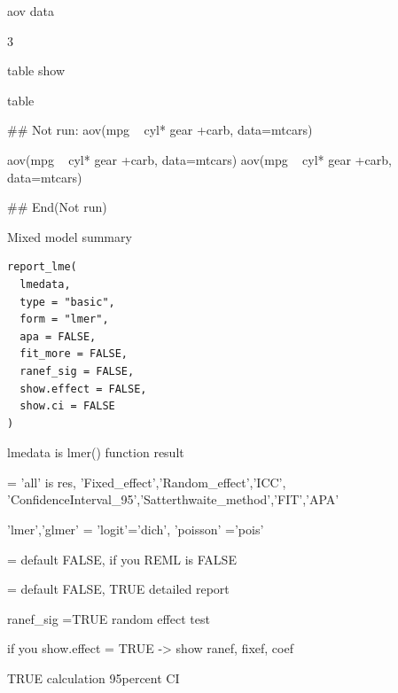 \documentclass[a4paper]{book}
\begin{document}
%
\begin{Arguments}
\begin{ldescription}
\item[\code{data}] aov data

\item[\code{digits}] 3

\item[\code{print}] table show
\end{ldescription}
\end{Arguments}
%
\begin{Value}
table
\end{Value}
%
\begin{Examples}
\begin{ExampleCode}

## Not run: 
aov(mpg ~ cyl* gear +carb, data=mtcars) %

aov(mpg ~ cyl* gear +carb, data=mtcars) %
aov(mpg ~ cyl* gear +carb, data=mtcars) %


## End(Not run)

\end{ExampleCode}
\end{Examples}
%
\begin{Description}
Mixed model summary
\end{Description}
%
\begin{Usage}
\begin{verbatim}
report_lme(
  lmedata,
  type = "basic",
  form = "lmer",
  apa = FALSE,
  fit_more = FALSE,
  ranef_sig = FALSE,
  show.effect = FALSE,
  show.ci = FALSE
)
\end{verbatim}
\end{Usage}
%
\begin{Arguments}
\begin{ldescription}
\item[\code{lmedata}] lmedata is lmer() function result

\item[\code{type}] = 'all' is res, 'Fixed\_effect','Random\_effect','ICC', 'ConfidenceInterval\_95','Satterthwaite\_method','FIT','APA'

\item[\code{form}] 'lmer','glmer' = 'logit'='dich', 'poisson' ='pois'

\item[\code{apa}] = default FALSE, if you  REML is FALSE

\item[\code{fit\_more}] = default FALSE, TRUE detailed report

\item[\code{ranef\_sig}] ranef\_sig =TRUE  random effect test

\item[\code{show.effect}] if you show.effect = TRUE -> show ranef, fixef, coef

\item[\code{show.ci}] TRUE calculation 95percent CI
\end{ldescription}
\end{Arguments}
\end{document}
